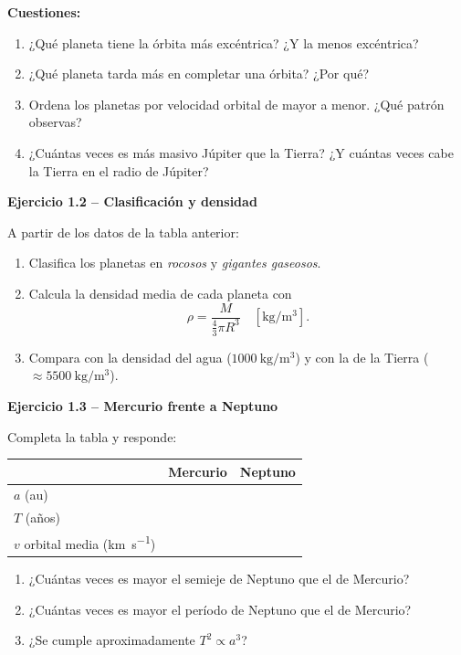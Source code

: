 \documentclass[11pt,a4paper]{article}
\newenvironment{cajaEjercicio}[1][]{\par\medskip\noindent\textbf{#1}\par\smallskip}{\par\medskip}
\theoremstyle{definition}
\begin{document}
\textbf{Cuestiones:}

\begin{enumerate}[label=\alph*),leftmargin=*]
  \item ¿Qué planeta tiene la órbita más excéntrica? ¿Y la menos excéntrica?
  \item ¿Qué planeta tarda más en completar una órbita? ¿Por qué?
  \item Ordena los planetas por velocidad orbital de mayor a menor. ¿Qué patrón observas?
  \item ¿Cuántas veces es más masivo Júpiter que la Tierra? ¿Y cuántas veces cabe la Tierra en el radio de Júpiter?
\end{enumerate}

\begin{cajaEjercicio}[Ejercicio 1.2 -- Clasificación y densidad]
A partir de los datos de la tabla anterior:
\begin{enumerate}[label=\alph*),leftmargin=*]
  \item Clasifica los planetas en \emph{rocosos} y \emph{gigantes gaseosos}.
  \item Calcula la densidad media de cada planeta con
  \[
    \rho = \frac{M}{\tfrac{4}{3}\pi R^{3}} \quad [\si{\kilo\gram\per\cubic\metre}].
  \]
  \item Compara con la densidad del agua ($\SI{1000}{\kilo\gram\per\cubic\metre}$) y con la de la Tierra ($\approx \SI{5500}{\kilo\gram\per\cubic\metre}$).
\end{enumerate}
\end{cajaEjercicio}

\begin{cajaEjercicio}[Ejercicio 1.3 -- Mercurio frente a Neptuno]
Completa la tabla y responde:

\begin{center}
\begin{tabular}{@{}lcc@{}}
\toprule
 & \textbf{Mercurio} & \textbf{Neptuno} \\
\midrule
$a$ (\si{\astronomicalunit}) & & \\
$T$ (años) & & \\
$v$ orbital media (\si{\kilo\metre\per\second}) & & \\
\bottomrule
\end{tabular}
\end{center}

\begin{enumerate}[label=\alph*),leftmargin=*]
  \item ¿Cuántas veces es mayor el semieje de Neptuno que el de Mercurio?
  \item ¿Cuántas veces es mayor el período de Neptuno que el de Mercurio?
  \item ¿Se cumple aproximadamente $T^{2}\propto a^{3}$?
\end{enumerate}
\end{cajaEjercicio}
\end{document}
